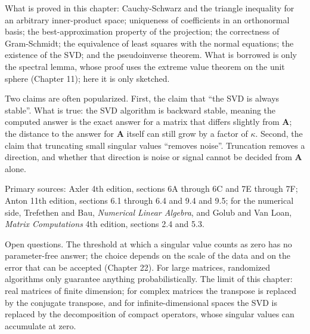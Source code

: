 \begin{untukpeneliti}
What is proved in this chapter: Cauchy-Schwarz and the triangle inequality for an arbitrary
inner-product space; uniqueness of coefficients in an orthonormal basis; the best-approximation property
of the projection; the correctness of Gram-Schmidt; the equivalence of least squares with the normal
equations; the existence of the SVD; and the pseudoinverse theorem. What is borrowed is only the spectral
lemma, whose proof uses the extreme value theorem on the unit sphere (Chapter 11); here it is only sketched.

Two claims are often popularized. First, the claim that ``the SVD is always stable''. What is true:
the SVD algorithm is backward stable, meaning the computed answer is the exact answer for
a matrix that differs slightly from $\mathbf{A}$; the distance to the answer for $\mathbf{A}$
itself can still grow by a factor of $\kappa$. Second, the claim that truncating small singular values
``removes noise''. Truncation removes a direction, and whether that direction is noise
or signal cannot be decided from $\mathbf{A}$ alone.

Primary sources: Axler 4th edition, sections 6A through 6C and 7E through 7F; Anton 11th edition,
sections 6.1 through 6.4 and 9.4 and 9.5; for the numerical side, Trefethen and Bau,
\emph{Numerical Linear Algebra}, and Golub and Van Loan, \emph{Matrix Computations}
4th edition, sections 2.4 and 5.3.

Open questions. The threshold at which a singular value counts as zero has no parameter-free
answer; the choice depends on the scale of the data and on the error that can be accepted (Chapter 22).
For large matrices, randomized algorithms only guarantee anything probabilistically. The limit of this chapter:
real matrices of finite dimension; for complex matrices the transpose is replaced by the conjugate transpose,
and for infinite-dimensional spaces the SVD is replaced by the decomposition of compact operators, whose
singular values can accumulate at zero.
\end{untukpeneliti}

